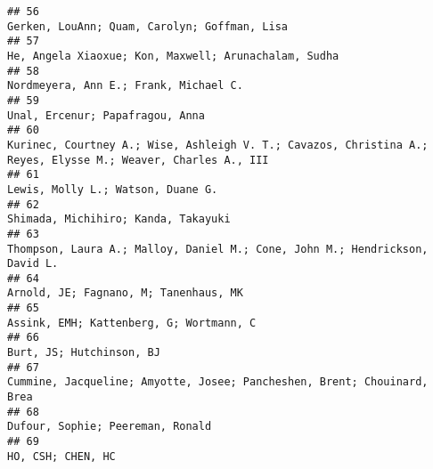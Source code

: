 \documentclass[
  english,
  man]{apa6}
\begin{document}
\begin{verbatim}
## 56                                                                                                                                              Gerken, LouAnn; Quam, Carolyn; Goffman, Lisa
## 57                                                                                                                                      He, Angela Xiaoxue; Kon, Maxwell; Arunachalam, Sudha
## 58                                                                                                                                                     Nordmeyera, Ann E.; Frank, Michael C.
## 59                                                                                                                                                           Unal, Ercenur; Papafragou, Anna
## 60                                                                              Kurinec, Courtney A.; Wise, Ashleigh V. T.; Cavazos, Christina A.; Reyes, Elysse M.; Weaver, Charles A., III
## 61                                                                                                                                                         Lewis, Molly L.; Watson, Duane G.
## 62                                                                                                                                                       Shimada, Michihiro; Kanda, Takayuki
## 63                                                                                                               Thompson, Laura A.; Malloy, Daniel M.; Cone, John M.; Hendrickson, David L.
## 64                                                                                                                                                     Arnold, JE; Fagnano, M; Tanenhaus, MK
## 65                                                                                                                                                   Assink, EMH; Kattenberg, G; Wortmann, C
## 66                                                                                                                                                                  Burt, JS; Hutchinson, BJ
## 67                                                                                                                   Cummine, Jacqueline; Amyotte, Josee; Pancheshen, Brent; Chouinard, Brea
## 68                                                                                                                                                          Dufour, Sophie; Peereman, Ronald
## 69                                                                                                                                                                         HO, CSH; CHEN, HC

\end{verbatim}
\end{document}
